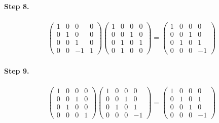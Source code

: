 \documentclass[11pt]{article}
\begin{document}
\paragraph{Step 8.}
\begin{eqnarray*}
\begin{pmatrix}
	1 & 0 & 0 & 0\\
	0 & 1 & 0 & 0\\
	0 & 0 & 1 & 0\\
	0 & 0 & -1 & 1
\end{pmatrix}
\left(\begin{array}{ccc|c}  
	1 & 0 & 0 & 0\\
    0 & 0 & 1 & 0\\
    0 & 1 & 0 & 1\\
    0 & 1 & 0 & 0
\end{array}\right)
=
\left(\begin{array}{ccc|c}  
	1 & 0 & 0 & 0\\
    0 & 0 & 1 & 0\\
    0 & 1 & 0 & 1\\
    0 & 0 & 0 & -1
\end{array}\right)
\end{eqnarray*}

\paragraph{Step 9.}
\begin{eqnarray*}
\begin{pmatrix}
	1 & 0 & 0 & 0\\
	0 & 0 & 1 & 0\\
	0 & 1 & 0 & 0\\
	0 & 0 & 0 & 1
\end{pmatrix}
\left(\begin{array}{ccc|c}  
	1 & 0 & 0 & 0\\
    0 & 0 & 1 & 0\\
    0 & 1 & 0 & 1\\
    0 & 0 & 0 & -1
\end{array}\right)
=
\left(\begin{array}{ccc|c}  
	1 & 0 & 0 & 0\\
    0 & 1 & 0 & 1\\
    0 & 0 & 1 & 0\\
    0 & 0 & 0 & -1
\end{array}\right)
\end{eqnarray*}
\end{document}
